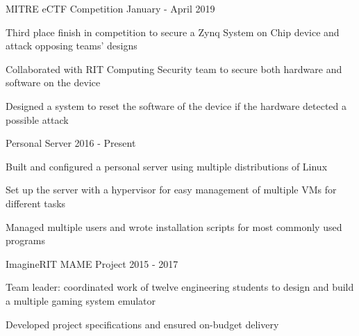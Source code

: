 
\begin{cventries}
%

  \cvproject
	{MITRE eCTF Competition}
	{January - April 2019}
	{
		\begin{cvitems}
		\item {Third place finish in competition to secure a Zynq System on Chip device and attack opposing teams' designs}
		\item {Collaborated with RIT Computing Security team to secure both hardware and software on the device}
		\item {Designed a system to reset the software of the device if the hardware detected a possible attack}
		\end{cvitems}
	}

  \cvproject
	{Personal Server}
	{2016 - Present}
    {
      \begin{cvitems}
        \item {Built and configured a personal server using multiple distributions of Linux}
		\item {Set up the server with a hypervisor for easy management of multiple VMs for different tasks}
		\item {Managed multiple users and wrote installation scripts for most commonly used programs}
      \end{cvitems}
    }

	\cvproject
	{ImagineRIT MAME Project}
	{2015 - 2017}
	{
		\begin{cvitems}
		\item{Team leader: coordinated work of twelve engineering students to design and build a multiple gaming system emulator}
		\item{Developed project specifications and ensured on-budget delivery}
		\end{cvitems}
	}
\end{cventries}
